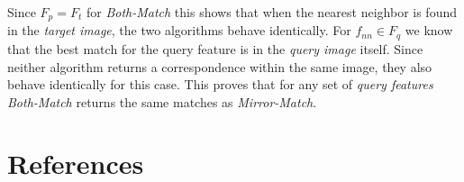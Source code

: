\documentclass[review]{elsarticle}
\begin{document}
Since $F_{p} = F_{t}$ for \emph{Both-Match} this shows that when the nearest neighbor is found in the \emph{target image}, the two algorithms behave identically. For $f_{nn} \in F_{q}$ we know that the best match for the query feature is in the \emph{query image} itself. Since neither algorithm returns a correspondence within the same image, they also behave identically for this case. This proves that for any set of \emph{query features} \emph{Both-Match} returns the same matches as \emph{Mirror-Match}.

\balance

\section*{References}


\end{document}
